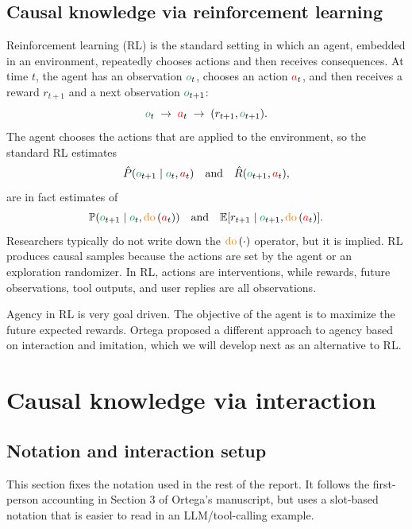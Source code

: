 \documentclass[11pt]{article}
\newcommand{\action}{\ensuremath{\textcolor{red}{a}}}
\newcommand{\obs}{\ensuremath{\textcolor{ForestGreen}{o}}}
\newcommand{\reward}{\ensuremath{r}}
\newcommand{\prob}{\ensuremath{\mathbb{P}}}
\newcommand{\E}{\ensuremath{\mathbb{E}}}
\newcommand{\doop}{\operatorname{\textcolor{orange}{do}}}
\newcommand{\intervene}[1]{\ensuremath{\doop \left(#1\right)}}
\begin{document}
\subsection{Causal knowledge via reinforcement learning}
\label{sec:rl-causal-knowledge}

Reinforcement learning (RL) is the standard setting in which an agent, embedded in an environment, repeatedly
chooses actions and then receives consequences. At time $t$, the agent has an observation $\obs_t$, chooses an
action $\action_t$, and then receives a reward $\reward_{t+1}$ and a next
observation $\obs_{t+1}$:
\[
  \obs_t \;\to\; \action_t \;\to\; (\reward_{t+1},\obs_{t+1}).
\]
The agent chooses the actions that are applied to the environment, so the standard RL estimates
\[
  \hat P(\obs_{t+1}\mid \obs_t,\action_t)
  \quad\text{and}\quad
  \hat R(\obs_{t+1},\action_t),
\]
are in fact estimates of
\[
  \prob(\obs_{t+1}\mid \obs_t,\intervene{\action_t})
  \quad\text{and}\quad
  \E[\reward_{t+1} \mid \obs_{t+1},\intervene{\action_t}].
\]
Researchers typically do not write down the $\intervene{\cdot}$ operator, but it is implied.
RL produces causal samples because the actions are set by the agent or an exploration
randomizer. In RL, actions are interventions, while rewards,
future observations, tool outputs, and user replies are all observations.

Agency in RL is very goal driven. The objective of the agent is to maximize the future expected rewards. Ortega proposed a different approach to agency based on interaction and imitation, which we will develop next as an alternative to RL.


\section{Causal knowledge via interaction}
\subsection{Notation and interaction setup}
\label{sec:notation-setup}

This section fixes the notation used in the rest of the report. It follows the
first-person accounting in Section 3 of Ortega's manuscript, but uses a
slot-based notation that is easier to read in an LLM/tool-calling example.
\end{document}
